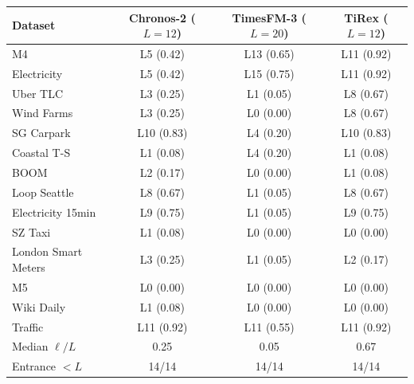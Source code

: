 \begin{tabular}{lccc}
\toprule
Dataset & Chronos-2 ($L{=}12$) & TimesFM-3 ($L{=}20$) & TiRex ($L{=}12$) \\
\midrule
M4 & L5 (0.42) & L13 (0.65) & L11 (0.92) \\
Electricity & L5 (0.42) & L15 (0.75) & L11 (0.92) \\
Uber TLC & L3 (0.25) & L1 (0.05) & L8 (0.67) \\
Wind Farms & L3 (0.25) & L0 (0.00) & L8 (0.67) \\
SG Carpark & L10 (0.83) & L4 (0.20) & L10 (0.83) \\
Coastal T-S & L1 (0.08) & L4 (0.20) & L1 (0.08) \\
BOOM & L2 (0.17) & L0 (0.00) & L1 (0.08) \\
Loop Seattle & L8 (0.67) & L1 (0.05) & L8 (0.67) \\
Electricity 15min & L9 (0.75) & L1 (0.05) & L9 (0.75) \\
SZ Taxi & L1 (0.08) & L0 (0.00) & L0 (0.00) \\
London Smart Meters & L3 (0.25) & L1 (0.05) & L2 (0.17) \\
M5 & L0 (0.00) & L0 (0.00) & L0 (0.00) \\
Wiki Daily & L1 (0.08) & L0 (0.00) & L0 (0.00) \\
Traffic & L11 (0.92) & L11 (0.55) & L11 (0.92) \\
\midrule
Median $\ell/L$ & 0.25 & 0.05 & 0.67 \\
Entrance $<L$ & 14/14 & 14/14 & 14/14 \\
\bottomrule
\end{tabular}
